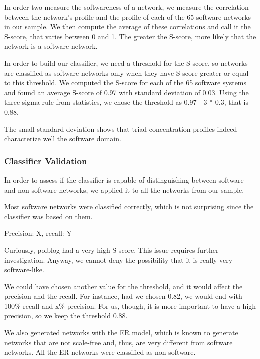 In order two measure the softwareness of a network, we measure the correlation
between the network's profile and the profile of each of the 65 software
networks in our sample. We then compute the average of these correlations and
call it the S-score, that varies between 0 and 1. The greater the S-score, more
likely that the network is a software network.

In order to build our classifier, we need a threshold for the S-score, so
networks are classified as software networks only when they have S-score greater
or equal to this threshold. We computed the S-score for each of the 65 software
systems and found an average S-score of 0.97 with standard deviation of 0.03.
Using the three-sigma rule from statistics, we chose the threshold as 0.97 - 3 *
0.3, that is 0.88. 

The small standard deviation shows that triad concentration profiles indeed
characterize well the software domain.

\subsubsection{Classifier Validation}

In order to assess if the classifier is capable of distinguishing between
software and non-software networks, we applied it to all the networks from our
sample. 

Most software networks were classified correctly, which is not surprising since
the classifier was based on them.

Precision: X, recall: Y

Curiously, polblog had a very high S-score. This issue requires further 
investigation. Anyway, we cannot deny the possibility that it is really very
software-like.

We could have chosen another value for the threshold, and it would affect the
precision and the recall. For instance, had we chosen 0.82, we would end with
100\% recall and x\% precision. For us, though, it is more important to have a
high precision, so we keep the threshold 0.88.

We also generated networks with the ER model, which is known to generate
networks that are not scale-free and, thus, are very different from software
networks. All the ER networks were classified as non-software.



